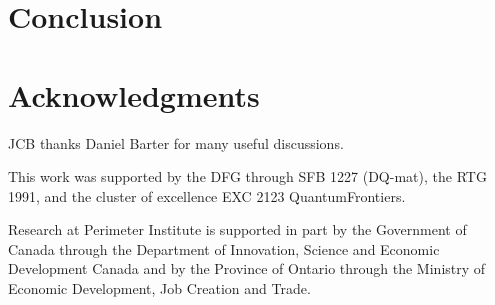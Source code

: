 \section{Conclusion}
\label{Conclusion}

\section*{Acknowledgments}
JCB thanks Daniel Barter for many useful discussions.

This work was supported by the DFG through SFB 1227 (DQ-mat), the RTG 1991, and the cluster of excellence EXC 2123 QuantumFrontiers.

Research at Perimeter Institute is supported in part by the Government of Canada through the Department of Innovation, Science and Economic Development Canada and by the Province of Ontario through the Ministry of Economic Development, Job Creation and Trade.



